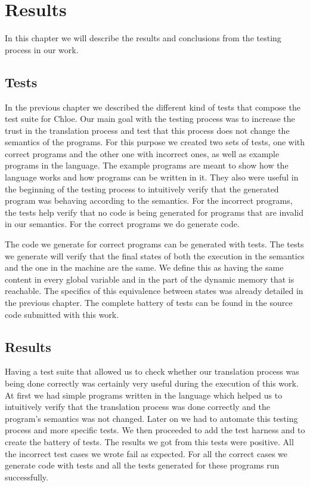 \chapter{Results}\label{chapter:results}

In this chapter we will describe the results and conclusions from the testing process in our work.

\section{Tests}

In the previous chapter we described the different kind of tests that compose the test suite for Chloe.
Our main goal with the testing process was to increase the trust in the translation process and test that this process does not change the semantics of the programs.
For this purpose we created two sets of tests, one with correct programs and the other one with incorrect ones, as well as example programs in the language.
The example programs are meant to show how the language works and how programs can be written in it.
They also were useful in the beginning of the testing process to intuitively verify that the generated program was behaving according to the semantics.
For the incorrect programs, the tests help verify that no code is being generated for programs that are invalid in our semantics.
For the correct programs we do generate code.

The code we generate for correct programs can be generated with tests.
The tests we generate will verify that the final states of both the execution in the semantics and the one in the machine are the same.
We define this as having the same content in every global variable and in the part of the dynamic memory that is reachable.
The specifics of this equivalence between states was already detailed in the previous chapter.
The complete battery of tests can be found in the source code submitted with this work.

\section{Results}

Having a test suite that allowed us to check whether our translation process was being done correctly was certainly very useful during the execution of this work.
At first we had simple programs written in the language which helped us to intuitively verify that the translation process was done correctly and the program's semantics was not changed.
Later on we had to automate this testing process and more specific tests.
We then proceeded to add the test harness and to create the battery of tests.
The results we got from this tests were positive.
All the incorrect test cases we wrote fail as expected.
For all the correct cases we generate code with tests and all the tests generated for these programs run successfully.

